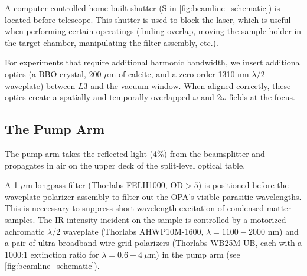 A computer controlled home-built shutter (S in \cref{fig:beamline_schematic}) is located before telescope. This shutter is used to block the laser, which is useful when performing certain operatings (finding overlap, moving the sample holder in the target chamber, manipulating the filter assembly, etc.).

For experiments that require additional harmonic bandwidth, we insert additional optics (a BBO crystal, 200 $\mu$m of calcite, and a zero-order 1310 nm $\lambda/2$ waveplate) between $L3$ and the vacuum window. When aligned correctly, these optics create a spatially and temporally overlapped $\omega$ and $2\omega$ fields at the focus.

\subsection{The Pump Arm}

The pump arm takes the reflected light (4\%) from the beamsplitter and propagates in air on the upper deck of the split-level optical table.

A 1 $\mu$m longpass filter (Thorlabs FELH1000, $\text{OD}>5$) is positioned before the waveplate-polarizer assembly to filter out the OPA's visible parasitic wavelengths. This is neccessary to suppress short-wavelength excitation of condensed matter samples. The IR intensity incident on the sample is controlled by a motorized achromatic $\lambda/2$ waveplate (Thorlabs AHWP10M-1600, $\lambda = 1100 - 2000$ nm) and a pair of ultra broadband wire grid polarizers (Thorlabs WB25M-UB, each with a 1000:1 extinction ratio for $\lambda = 0.6 - 4 \ \mu \text{m}$) in the pump arm (see \cref{fig:beamline_schematic}). 

